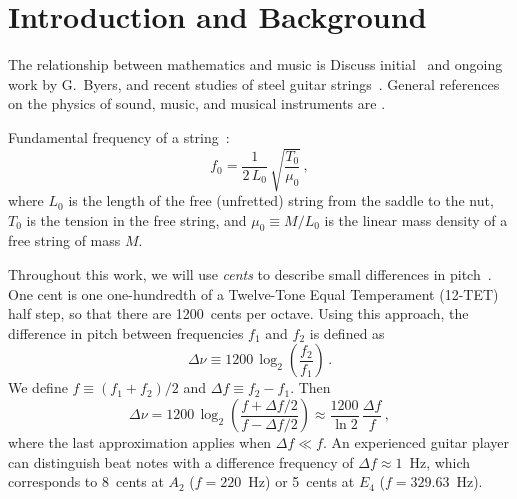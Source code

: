 %
%
%

 \section{Introduction and Background\label{sct:intro}}
 
The relationship between mathematics and music is 
Discuss initial~\cite{ref:byers1996cgi} and ongoing~\cite{ref:byersweb} work by G.\ Byers, and recent studies of steel guitar strings~\cite{ref:varieschi2010icf}. General references on the physics of sound, music, and musical instruments are \cite{ref:morse1981vas,ref:fletcher2005pmi}.

Fundamental frequency of a string~\cite{ref:morse1981vsa}:
 \begin{equation} \label{eqn:f_0_def}
f_0 = \frac{1}{2\, L_0}\, \sqrt{\frac{T_0}{\mu_0}}\, ,
 \end{equation}
where $L_0$ is the length of the free (unfretted) string from the saddle to the nut, $T_0$ is the tension in the free string, and $\mu_0 \equiv M / L_0$ is the linear mass density of a free string of mass $M$.

Throughout this work, we will use \emph{cents} to describe small differences in pitch~\cite{ref:durfee2015pms}. One cent is one one-hundredth of a Twelve-Tone Equal Temperament (12-TET) half step, so that there are 1200~cents per octave. Using this approach, the difference in pitch between frequencies $f_1$ and $f_2$ is defined as
 \begin{equation} \label{eqn:cents_def}
\Delta \nu \equiv 1200\, \log_2\left(\frac{f_2}{f_1}\right)\, .
 \end{equation}
We define $f \equiv (f_1 + f_2) / 2$ and $\Delta f \equiv f_2 - f_1$. Then
 \begin{equation} \label{eqn:cents_approx}
\Delta \nu = 1200\, \log_2\left(\frac{f + \Delta f / 2}{f - \Delta f /2}\right) \approx \frac{1200}{\ln 2}\, \frac{\Delta f}{f}\, ,
 \end{equation}
where the last approximation applies when $\Delta f \ll f$. An experienced guitar player can distinguish beat notes with a difference frequency of $\Delta f \approx 1$~Hz, which corresponds to 8~cents at $A_2$ ($f = 220$~Hz) or 5~cents at $E_4$ ($f = 329.63$~Hz).

